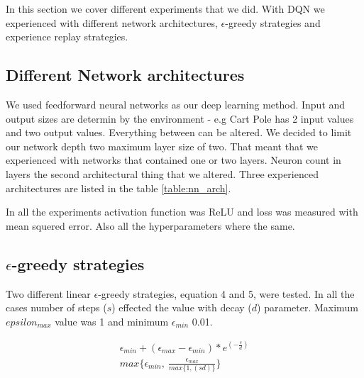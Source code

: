 In this section we cover different experiments that we did. With DQN we experienced with different network architectures, $\epsilon$-greedy strategies and experience replay strategies.

\subsection{Different Network architectures}
We used feedforward neural networks as our deep learning method. Input and output sizes are determin by the environment - e.g Cart Pole has 2 input values and two output values. Everything between can be altered. We decided to limit our network depth two maximum layer size of two. That meant that we experienced with networks that contained one or two layers. Neuron count in layers the second architectural thing that we altered. Three experienced architectures are listed in the table \ref{table:nn_arch}.
\begin{table}[H]
    \caption{Different network architectures used with DQN.}
    \centering
    \label{table:nn_arch}
\end{table}
In all the experiments activation function was ReLU and loss was measured with mean squered error. Also all the hyperparameters where the same.

\subsection{$\epsilon$-greedy strategies}
Two different linear $\epsilon$-greedy strategies, equation 4 and 5, were tested. In all the cases number of steps ($s$) effected the value with decay ($d$) parameter. Maximum $epsilon_{max}$ value was 1 and minimum $\epsilon_{min}$ 0.01.

\begin{align}
    \epsilon_{min} + (\epsilon_{max} - \epsilon_{min}) * e^{(-\frac{s}{d})} \\
    max \{\epsilon_{min},\:\frac{\epsilon_{max}}{max \{1, (sd)\}} \}
\end{align}
